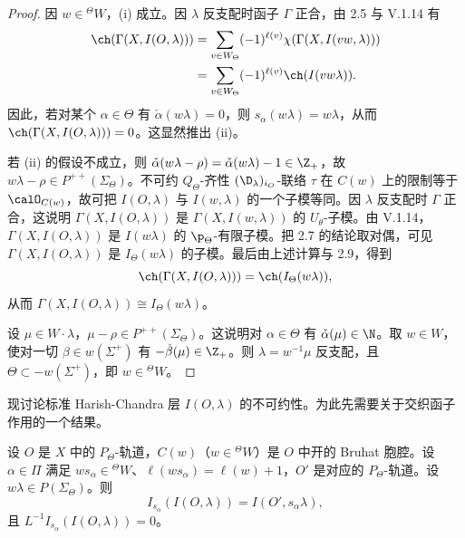 \begin{proof}
因 $w\in{}^{\Theta}W$，(i) 成立。因 $\lambda$ 反支配时函子 $\Gamma$ 正合，由 2.5 与 V.1.14 有
\begin{align*}
\ch(\Gamma(X,I(O,\lambda)))&=\sum_{v\in W_\Theta}(-1)^{\ell(v)}\chi(\Gamma(X,I(vw,\lambda)))\\
&=\sum_{v\in W_\Theta}(-1)^{\ell(v)}\ch(I(vw\lambda)).
\end{align*}
因此，若对某个 $\alpha\in\Theta$ 有 $\check\alpha(w\lambda)=0$，则 $s_\alpha(w\lambda)=w\lambda$，从而 $\ch(\Gamma(X,I(O,\lambda)))=0$。这显然推出 (ii)。

若 (ii) 的假设不成立，则 $\check\alpha(w\lambda-\rho)=\check\alpha(w\lambda)-1\in\Z_+$，故 $w\lambda-\rho\in P^{++}(\Sigma_\Theta)$。不可约 $Q_\Theta$-齐性 $(\D_\lambda)_{i_O}$-联络 $\tau$ 在 $C(w)$ 上的限制等于 $\calO_{C(w)}$，故可把 $I(O,\lambda)$ 与 $I(w,\lambda)$ 的一个子模等同。因 $\lambda$ 反支配时 $\Gamma$ 正合，这说明 $\Gamma(X,I(O,\lambda))$ 是 $\Gamma(X,I(w,\lambda))$ 的 $U_\theta$-子模。由 V.1.14，$\Gamma(X,I(O,\lambda))$ 是 $I(w\lambda)$ 的 $\p_\Theta$-有限子模。把 2.7 的结论取对偶，可见 $\Gamma(X,I(O,\lambda))$ 是 $I_\Theta(w\lambda)$ 的子模。最后由上述计算与 2.9，得到
$$\ch(\Gamma(X,I(O,\lambda)))=\ch(I_\Theta(w\lambda)),$$
从而 $\Gamma(X,I(O,\lambda))\cong I_\Theta(w\lambda)$。

设 $\mu\in W\cdot\lambda$，$\mu-\rho\in P^{++}(\Sigma_\Theta)$。这说明对 $\alpha\in\Theta$ 有 $\check\alpha(\mu)\in\N$。取 $w\in W$，使对一切 $\beta\in w(\Sigma^+)$ 有 $-\check\beta(\mu)\in\Z_+$。则 $\lambda=w^{-1}\mu$ 反支配，且 $\Theta\subset-w(\Sigma^+)$，即 $w\in{}^{\Theta}W$。
\end{proof}

现讨论标准 Harish-Chandra 层 $I(O,\lambda)$ 的不可约性。为此先需要关于交织函子作用的一个结果。

\begin{lemma}\label{lem:06.2.11}
设 $O$ 是 $X$ 中的 $P_\Theta$-轨道，$C(w)$（$w\in{}^{\Theta}W$）是 $O$ 中开的 Bruhat 胞腔。设 $\alpha\in\Pi$ 满足 $ws_\alpha\in{}^{\Theta}W$、$\ell(ws_\alpha)=\ell(w)+1$，$O'$ 是对应的 $P_\Theta$-轨道。设 $w\lambda\in P(\Sigma_\Theta)$。则
$$I_{s_\alpha}(I(O,\lambda))=I(O',s_\alpha\lambda),$$
且 $L^{-1}I_{s_\alpha}(I(O,\lambda))=0$。
\end{lemma}

